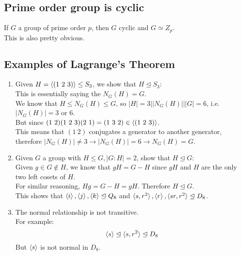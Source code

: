 \documentclass{article}
\begin{document}
\subsection*{Prime order group is cyclic}
If $G$ a group of prime order $p$, then $G$ cyclic and $G \simeq Z_p$.\\
This is also pretty obvious.
\subsection*{Examples of Lagrange's Theorem}
\begin{enumerate}
    \item Given $H = \braket{(1\ 2\ 3)} \leq S_3$, we show that $H \trianglelefteq S_3$:\\
    This is essentially saying the $N_G(H) = G$.\\
    We know that $H \leq N_G(H) \leq G$, so $|H| = 3 \big| |N_G(H)| \big| |G| = 6$, i.e. $|N_G(H)| = 3$ or $6$.\\
    But since $(1\ 2)(1\ 2\ 3)(2\ 1) = (1\ 3\ 2) \in \braket{(1\ 2\ 3)}$.\\
    This means that $(1\ 2)$ conjugates a generator to another generator, therefore $|N_G(H)| \neq 3 \rightarrow |N_G(H)| = 6 \rightarrow N_G(H) = G$.
    \item Given $G$ a group with $H \leq G, |G:H| = 2$, show that $H \trianglelefteq G$:\\
    Given $g \in G \notin H$, we know that $gH = G - H$ since $gH$ and $H$ are the only two left cosets of $H$.\\
    For similar reasoning, $Hg = G - H = gH$. Therefore $H \trianglelefteq G$.\\
    This shows that $\braket{i}, \braket{j}, \braket{k} \trianglelefteq Q_8$ and $\braket{s, r^2}, \braket{r}, \braket{sr, r^2} \trianglelefteq D_8$.
    \item The normal relationship is not transitive.\\
    For example:
    \begin{equation*}
        \braket{s} \trianglelefteq \braket{s, r^2} \trianglelefteq D_8
    \end{equation*}
    But $\braket{s}$ is not normal in $D_8$.
\end{enumerate}
\end{document}
